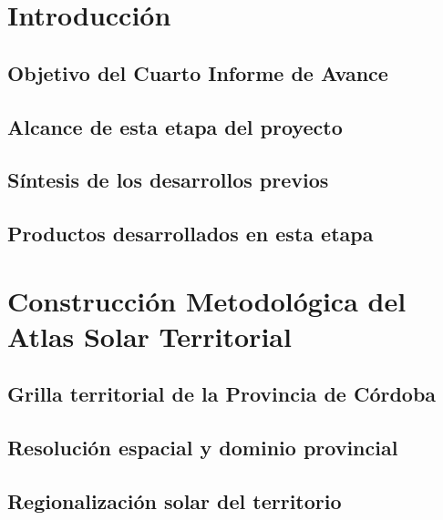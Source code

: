 \documentclass[11pt,a4paper]{article}
\begin{document}

\tableofcontents
\newpage



\section{Introducción}

\subsection{Objetivo del Cuarto Informe de Avance}
\subsection{Alcance de esta etapa del proyecto}
\subsection{Síntesis de los desarrollos previos}
\subsection{Productos desarrollados en esta etapa}



\section{Construcción Metodológica del Atlas Solar Territorial}

\subsection{Grilla territorial de la Provincia de Córdoba}
\subsection{Resolución espacial y dominio provincial}
\subsection{Regionalización solar del territorio}
\end{document}
